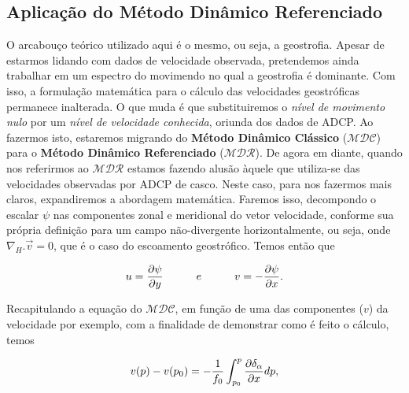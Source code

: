 \documentclass[12pt,portuguese,a4paper,pdftex]{article}
\begin{document}
\subsection{Aplicação do Método Dinâmico Referenciado}\label{sec:psi_oeii}

\hspace{6mm} O arcabouço teórico utilizado aqui é o mesmo, ou seja, a geostrofia. Apesar de estarmos
lidando com dados de velocidade observada, pretendemos ainda trabalhar em um espectro do movimendo no qual a geostrofia
é dominante. Com isso, a formulação matemática para o cálculo das velocidades geostróficas permanece
inalterada. O que muda é que substituiremos o {\it nível de movimento nulo} por um {\it nível de velocidade
conhecida}, oriunda dos dados de ADCP. Ao fazermos isto, estaremos migrando do {\bf Método Dinâmico Clássico} ($\mathcal{MDC}$) para 
o {\bf Método Dinâmico Referenciado} ($\mathcal{MDR}$). De agora em diante, quando nos referirmos ao $\mathcal{MDR}$
estamos fazendo alusão àquele que utiliza-se das velocidades observadas por ADCP de casco. Neste caso, para nos fazermos mais claros, expandiremos a abordagem 
matemática. Faremos isso, decompondo o escalar $\psi$ nas componentes zonal e meridional do vetor velocidade, 
conforme sua própria definição \citep{kundu1990} para um campo não-divergente horizontalmente, ou seja, onde $\nabla_H . \vec{v} = 0$, que é o caso do escoamento geostrófico. Temos então que  

\begin{equation}
u = \frac{\partial \psi}{\partial y} \ \ \ \ \ \ \ \ \  e  \ \ \ \ \ \ \ \ \  v = -\frac{\partial \psi}{\partial x}.
\vspace{0.5cm}
\label{eq:uvpsi}
\end{equation}

Recapitulando a equação do $\mathcal{MDC}$, em função de uma das componentes ($v$) da velocidade por exemplo, com a finalidade
de demonstrar como é feito o cálculo, temos

\begin{equation}
v(p) - v(p_0) = - \frac{1}{f_0} \int_{p_0}^p \frac{\partial \delta_\alpha}{\partial x} dp,
\vspace{0.5cm}
\label{eq:ugeo}
\end{equation}
\end{document}
